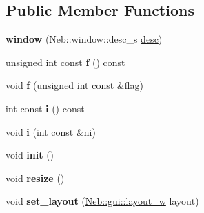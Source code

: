 \subsection*{\-Public \-Member \-Functions}
\begin{DoxyCompactItemize}
\item 
\hypertarget{classNeb_1_1window_1_1window_a1e41b3baa5b02308d52f2eb0af47a3eb}{{\bfseries window} (\-Neb\-::window\-::desc\-\_\-s \hyperlink{classNeb_1_1window_1_1desc}{desc})}\label{classNeb_1_1window_1_1window_a1e41b3baa5b02308d52f2eb0af47a3eb}

\item 
\hypertarget{classNeb_1_1window_1_1window_aa00edd7a22f613661ccbc87996d19c45}{unsigned int const {\bfseries f} () const }\label{classNeb_1_1window_1_1window_aa00edd7a22f613661ccbc87996d19c45}

\item 
\hypertarget{classNeb_1_1window_1_1window_a7bd37e1175879f13e133ec69544b6415}{void {\bfseries f} (unsigned int const \&\hyperlink{structNeb_1_1window_1_1window_1_1flag}{flag})}\label{classNeb_1_1window_1_1window_a7bd37e1175879f13e133ec69544b6415}

\item 
\hypertarget{classNeb_1_1window_1_1window_a90425a3005c529708aaf54a2395e66e3}{int const {\bfseries i} () const }\label{classNeb_1_1window_1_1window_a90425a3005c529708aaf54a2395e66e3}

\item 
\hypertarget{classNeb_1_1window_1_1window_a1a518c5dba635be8cf80ef80e4ab9d12}{void {\bfseries i} (int const \&ni)}\label{classNeb_1_1window_1_1window_a1a518c5dba635be8cf80ef80e4ab9d12}

\item 
\hypertarget{classNeb_1_1window_1_1window_ad7992d03a87b54eee6803f516010e845}{void {\bfseries init} ()}\label{classNeb_1_1window_1_1window_ad7992d03a87b54eee6803f516010e845}

\item 
\hypertarget{classNeb_1_1window_1_1window_a25ea811ebe0dcb6e18d25ab6d018d156}{void {\bfseries resize} ()}\label{classNeb_1_1window_1_1window_a25ea811ebe0dcb6e18d25ab6d018d156}

\item 
\hypertarget{classNeb_1_1window_1_1window_a89572e5de726e125d70c141f1b4eda96}{void {\bfseries set\-\_\-layout} (\hyperlink{classNeb_1_1weak__ptr}{\-Neb\-::gui\-::layout\-\_\-w} layout)}\label{classNeb_1_1window_1_1window_a89572e5de726e125d70c141f1b4eda96}


\end{DoxyCompactItemize}
